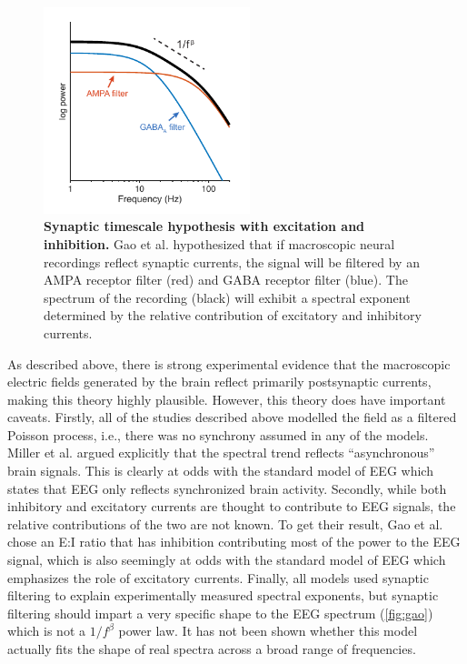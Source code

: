 \begin{figure}
\vspace{-20pt}
\centering
\includegraphics[width=60mm]{Figures/chapter1/EI.pdf}
\vspace{-14pt}
\caption{\textbf{Synaptic timescale hypothesis with excitation and inhibition.} Gao et al. \cite{Gao2017} hypothesized that if macroscopic neural recordings reflect synaptic currents, the signal will be filtered by an AMPA receptor filter (red) and GABA receptor filter (blue). The spectrum of the recording (black) will exhibit a spectral exponent determined by the relative contribution of excitatory and inhibitory currents.}  \label{fig:gao}
\end{figure}

As described above, there is strong experimental evidence that the macroscopic electric fields generated by the brain reflect primarily postsynaptic currents, making this theory highly plausible. However, this theory does have important caveats. Firstly, all of the studies described above modelled the field as a filtered Poisson process, i.e., there was no synchrony assumed in any of the models. Miller et al.\cite{Miller2009} argued explicitly that the spectral trend reflects ``asynchronous'' brain signals. This is clearly at odds with the standard model of EEG which states that EEG only reflects synchronized brain activity. Secondly, while both inhibitory and excitatory currents are thought to contribute to EEG signals, the relative contributions of the two are not known. To get their result, Gao et al. \cite{Gao2017} chose an E:I ratio that has inhibition contributing  most of the power to the EEG signal, which is also seemingly at odds with the standard model of EEG which emphasizes the role of excitatory currents. Finally, all models used synaptic filtering to explain experimentally measured spectral exponents, but synaptic filtering should impart a very specific shape to the EEG spectrum (\autoref{fig:gao}) which is not a $1/f^\beta$ power law. It has not been shown whether this model actually fits the shape of real spectra across a broad range of frequencies.

